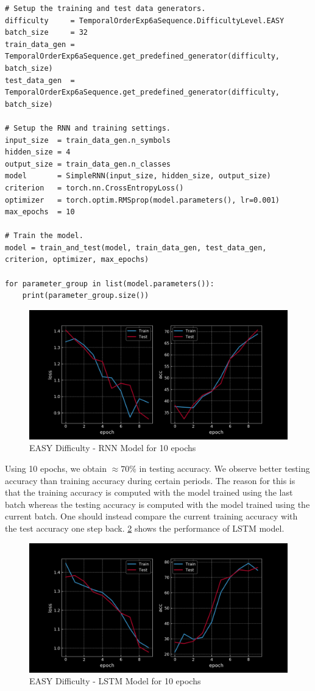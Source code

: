 \begin{verbatim}
# Setup the training and test data generators.
difficulty     = TemporalOrderExp6aSequence.DifficultyLevel.EASY
batch_size     = 32
train_data_gen = TemporalOrderExp6aSequence.get_predefined_generator(difficulty, batch_size)
test_data_gen  = TemporalOrderExp6aSequence.get_predefined_generator(difficulty, batch_size)

# Setup the RNN and training settings.
input_size  = train_data_gen.n_symbols
hidden_size = 4
output_size = train_data_gen.n_classes
model       = SimpleRNN(input_size, hidden_size, output_size)
criterion   = torch.nn.CrossEntropyLoss()
optimizer   = torch.optim.RMSprop(model.parameters(), lr=0.001)
max_epochs  = 10

# Train the model.
model = train_and_test(model, train_data_gen, test_data_gen, criterion, optimizer, max_epochs)

for parameter_group in list(model.parameters()):
    print(parameter_group.size())
\end{verbatim}
\begin{figure}[H]
    \centering
    \includegraphics[width=0.5\linewidth]{figs/rnn_easy_10.png}
    \caption{EASY Difficulty - RNN Model for 10 epochs}
    \label{fig:rnn_easy_10}
\end{figure}

Using 10 epochs, we obtain $\approx 70\%$ in testing accuracy. 
We observe better testing accuracy than training accuracy during certain periods. 
The reason for this is that the training accuracy is computed with the model trained using the last batch whereas the testing accuracy is computed with the model trained using the current batch. 
One should instead compare the current training accuracy with the test accuracy one step back.
\cref{fig:lstm_easy_10} shows the performance of LSTM model.

\begin{figure}[H]
    \centering
    \includegraphics[width=0.5\linewidth]{figs/lstm_easy_10.png}
    \caption{EASY Difficulty - LSTM Model for 10 epochs}
    \label{fig:lstm_easy_10}
\end{figure}

